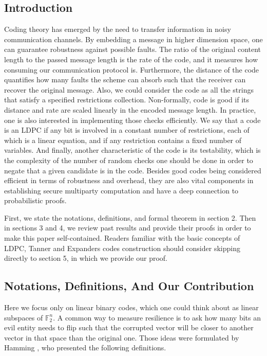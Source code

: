 \documentclass[sigplan,screen]{acmart}
\begin{document}
\begin{multicols*}{2}
  \section{Introduction}
  Coding theory has emerged by the need to transfer information in noisy communication channels. By embedding a message in higher dimension space, one can guarantee robustness against possible faults. The ratio of the original content length to the passed message length is the rate of the code, and it measures how consuming our communication protocol is. Furthermore, the distance of the code quantifies how many faults the scheme can absorb such that the receiver can recover the original message. Also, we could consider the code as all the strings that satisfy a specified restrictions collection.
  Non-formally, code is good if its distance and rate are scaled linearly in the encoded message length. In practice, one is also interested in implementing those checks efficiently. We say that a code is an LDPC if any bit is involved in a constant number of restrictions, each of which is a linear equation, and if any restriction contains a fixed number of variables. And finally, another characteristic of the code is its testability, which is the complexity of the number of random checks one should be done in order to negate that a given candidate is in the code.
  Besides good codes being considered efficient in terms of robustness and overhead, they are also vital components in establishing secure multiparty computation \cite{MultiParty} and have a deep connection to probabilistic proofs.

  First, we state the notations, definitions, and formal theorem in section 2. Then in sections 3 and 4, we review past results and provide their proofs in order to make this paper self-contained. Readers familiar with the basic concepts of LDPC, Tanner and Expanders codes construction should consider skipping directly to section 5, in which we provide our proof. 
  \subsection{Notations, Definitions, And Our Contribution}
  Here we focus only on linear binary codes, which one could think about as linear subspaces of $\mathbb{F}_{2}^{n}$. A common way to measure resilience is to ask how many bits an evil entity needs to flip such that the corrupted vector will be closer to another vector in that space than the original one. Those ideas were formulated by Hamming \cite{Hamming}, who presented the following definitions. 

\end{multicols*}
\end{document}
